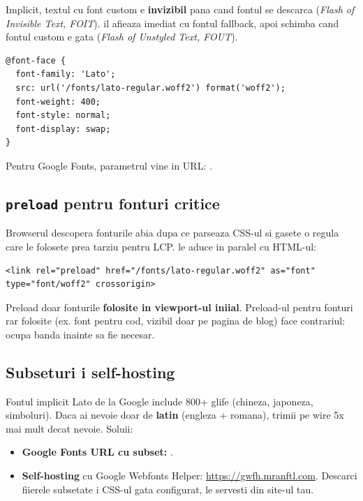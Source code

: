 Implicit, textul cu font custom e \textbf{invizibil} pana cand fontul se descarca (\emph{Flash of Invisible Text, FOIT}).  il afieaza imediat cu fontul fallback, apoi schimba cand fontul custom e gata (\emph{Flash of Unstyled Text, FOUT}).

\begin{lstlisting}[style=css, caption={Self-hosting cu \texttt{font-display}}]
@font-face {
  font-family: 'Lato';
  src: url('/fonts/lato-regular.woff2') format('woff2');
  font-weight: 400;
  font-style: normal;
  font-display: swap;
}
\end{lstlisting}

Pentru Google Fonts, parametrul vine in URL: .

\subsection{\texttt{preload} pentru fonturi critice}

Browserul descopera fonturile abia dupa ce parseaza CSS-ul si gasete o regula care le folosete \textendash{} prea tarziu pentru LCP.  le aduce in paralel cu HTML-ul:

\begin{lstlisting}[style=html, numbers=none]
<link rel="preload" href="/fonts/lato-regular.woff2" as="font" type="font/woff2" crossorigin>
\end{lstlisting}

\begin{atentie}
Preload doar fonturile \textbf{folosite in viewport-ul iniial}. Preload-ul pentru fonturi rar folosite (ex. font pentru cod, vizibil doar pe pagina de blog) face contrariul: ocupa banda inainte sa fie necesar.
\end{atentie}

\subsection{Subseturi i self-hosting}

Fontul implicit Lato de la Google include 800+ glife (chineza, japoneza, simboluri). Daca ai nevoie doar de \textbf{latin} (engleza + romana), trimii pe wire 5x mai mult decat nevoie. Soluii:

\begin{itemize}[itemsep=1pt]
  \item \textbf{Google Fonts URL cu subset:} .
  \item \textbf{Self-hosting} cu Google Webfonts Helper: \url{https://gwfh.mranftl.com}. Descarci fiierele  subsetate i CSS-ul gata configurat, le servesti din site-ul tau.
\end{itemize}


